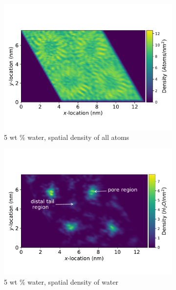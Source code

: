 \documentclass[journal=jpcbfk,manuscript=article]{achemso}
\begin{document}
  \begin{figure}[!htb]
  \centering
  \begin{subfigure}{0.45\textwidth}
  \includegraphics[width=\textwidth]{total_density_5wt.pdf}
  \caption{5 wt \% water, spatial density of all atoms}\label{fig:total_density_5wt}
  \end{subfigure}
  \begin{subfigure}{0.45\textwidth}
  \includegraphics[width=\textwidth]{total_water_density_5wt.pdf}
  \caption{5 wt \% water, spatial density of water}\label{fig:total_water_density_5wt}
  \end{subfigure}
  \begin{subfigure}{0.45\textwidth}

\end{subfigure}
\end{figure}
\end{document}
